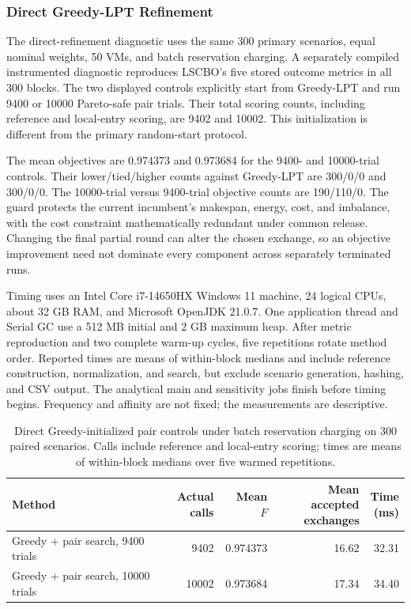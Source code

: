 \subsubsection{Direct Greedy-LPT Refinement}\label{sec:direct_pair}
The direct-refinement diagnostic uses the same 300 primary scenarios, equal nominal weights, 50 VMs, and batch reservation charging. A separately compiled instrumented diagnostic reproduces LSCBO's five stored outcome metrics in all 300 blocks. The two displayed controls explicitly start from Greedy-LPT and run 9400 or 10000 Pareto-safe pair trials. Their total scoring counts, including reference and local-entry scoring, are 9402 and 10002. This initialization is different from the primary random-start protocol.

The mean objectives are 0.974373 and 0.973684 for the 9400- and 10000-trial controls. Their lower/tied/higher counts against Greedy-LPT are 300/0/0 and 300/0/0. The 10000-trial versus 9400-trial objective counts are 190/110/0. The guard protects the current incumbent's makespan, energy, cost, and imbalance, with the cost constraint mathematically redundant under common release. Changing the final partial round can alter the chosen exchange, so an objective improvement need not dominate every component across separately terminated runs.

Timing uses an Intel Core i7-14650HX Windows 11 machine, 24 logical CPUs, about 32 GB RAM, and Microsoft OpenJDK 21.0.7. One application thread and Serial GC use a 512 MB initial and 2 GB maximum heap. After metric reproduction and two complete warm-up cycles, five repetitions rotate method order. Reported times are means of within-block medians and include reference construction, normalization, and search, but exclude scenario generation, hashing, and CSV output. The analytical main and sensitivity jobs finish before timing begins. Frequency and affinity are not fixed; the measurements are descriptive.
\begin{table}[!htbp]\centering\small
\setlength{\tabcolsep}{4pt}
\caption{Direct Greedy-initialized pair controls under batch reservation charging on 300 paired scenarios. Calls include reference and local-entry scoring; times are means of within-block medians over five warmed repetitions.}\label{tab:direct_pair}
\begin{tabular}{p{}rrrr}\toprule
Method & \shortstack{Actual\\calls} & Mean $F$ & \shortstack{Mean accepted\\exchanges} & \shortstack{Time\\(ms)}\\\midrule
Greedy + pair search, 9400 trials & 9402 & 0.974373 & 16.62 & 32.31 \\
Greedy + pair search, 10000 trials & 10002 & 0.973684 & 17.34 & 34.40 \\
\bottomrule\end{tabular}\end{table}

